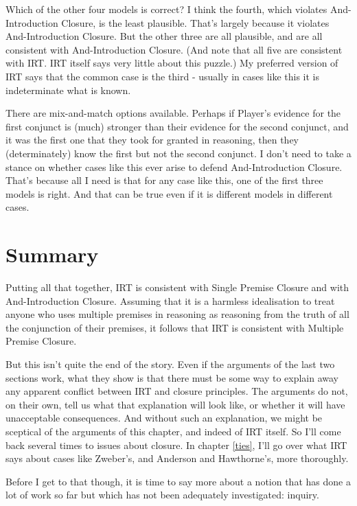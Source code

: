 \documentclass[
  11pt,
]{book}
\begin{document}
Which of the other four models is correct? I think the fourth, which violates And-Introduction Closure, is the least plausible. That's largely because it violates And-Introduction Closure. But the other three are all plausible, and are all consistent with And-Introduction Closure. (And note that all five are consistent with IRT. IRT itself says very little about this puzzle.) My preferred version of IRT says that the common case is the third - usually in cases like this it is indeterminate what is known.

There are mix-and-match options available. Perhaps if Player's evidence for the first conjunct is (much) stronger than their evidence for the second conjunct, and it was the first one that they took for granted in reasoning, then they (determinately) know the first but not the second conjunct. I don't need to take a stance on whether cases like this ever arise to defend And-Introduction Closure. That's because all I need is that for any case like this, one of the first three models is right. And that can be true even if it is different models in different cases.

\hypertarget{closuresummary}{%
\section{Summary}\label{closuresummary}}

Putting all that together, IRT is consistent with Single Premise Closure and with And-Introduction Closure. Assuming that it is a harmless idealisation to treat anyone who uses multiple premises in reasoning as reasoning from the truth of all the conjunction of their premises, it follows that IRT is consistent with Multiple Premise Closure.

But this isn't quite the end of the story. Even if the arguments of the last two sections work, what they show is that there must be some way to explain away any apparent conflict between IRT and closure principles. The arguments do not, on their own, tell us what that explanation will look like, or whether it will have unacceptable consequences. And without such an explanation, we might be sceptical of the arguments of this chapter, and indeed of IRT itself. So I'll come back several times to issues about closure. In chapter \ref{ties}, I'll go over what IRT says about cases like Zweber's, and Anderson and Hawthorne's, more thoroughly.

Before I get to that though, it is time to say more about a notion that has done a lot of work so far but which has not been adequately investigated: inquiry.
\end{document}
